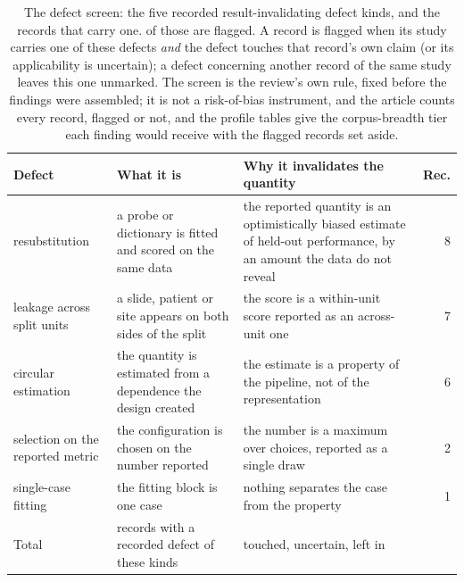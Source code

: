 \begin{table}[!t]
\centering\footnotesize\setlength\tabcolsep{3pt}\renewcommand{\arraystretch}{1.08}
\caption{The defect screen: the five recorded result-invalidating defect kinds, and the \Fdefrec{} records that carry one. \Fflagrec{} of those are flagged. A record is flagged when its study carries one of these defects \emph{and} the defect touches that record's own claim (or its applicability is uncertain); a defect concerning another record of the same study leaves this one unmarked. The screen is the review's own rule, fixed before the findings were assembled; it is not a risk-of-bias instrument, and the article counts every record, flagged or not, and the profile tables give the corpus-breadth tier each finding would receive with the flagged records set aside.}
\label{tab:defects}
\begin{tabular}{@{}L{1.9cm}L{2.4cm}L{2.0cm}r@{}}
\toprule
Defect & What it is & Why it invalidates the quantity & Rec. \\
\midrule
resubstitution & a probe or dictionary is fitted and scored on the same data & the reported quantity is an optimistically biased estimate of held-out performance, by an amount the data do not reveal & 8 \\
leakage across split units & a slide, patient or site appears on both sides of the split & the score is a within-unit score reported as an across-unit one & 7 \\
circular estimation & the quantity is estimated from a dependence the design created & the estimate is a property of the pipeline, not of the representation & 6 \\
selection on the reported metric & the configuration is chosen on the number reported & the number is a maximum over choices, reported as a single draw & 2 \\
single-case fitting & the fitting block is one case & nothing separates the case from the property & 1 \\
\midrule
Total & records with a recorded defect of these kinds & \Fdeftouch{} touched, \Fdefunc{} uncertain, \Fdefstay{} left in & \Fdefrec{} \\
\bottomrule
\end{tabular}
\end{table}

